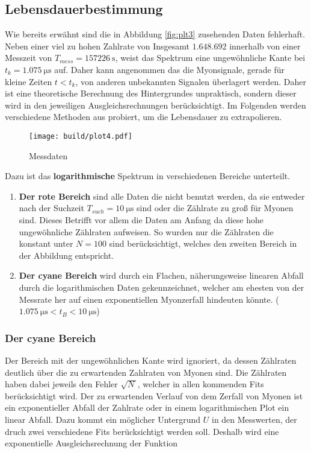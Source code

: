 \subsection{Lebensdauerbestimmung}
Wie bereits erwähnt sind die in Abbildung \eqref{fig:plt3} zusehenden Daten fehlerhaft. 
Neben einer viel zu hohen Zahlrate von Insgesamt $1.648.692$ innerhalb von einer Messzeit von $T_{mess}=\qty{157226}{\s}$,
weist das Spektrum eine ungewöhnliche Kante bei $t_k=\qty{1.075}{\us}$ auf.
Daher kann angenommen das die Myonsignale, gerade für kleine Zeiten $t<t_k$, von anderen unbekannten Signalen überlagert werden. 
Daher ist eine theoretische Berechnung des Hintergrundes unpraktisch, sondern dieser wird in den jeweiligen Ausgleichsrechnungen berücksichtigt. 
Im Folgenden werden verschiedene Methoden aus probiert, um die Lebensdauer zu extrapolieren. 
 
\begin{figure}[H]
	\centering
	\texttt{[image: build/plot4.pdf]}
	\caption{Messdaten}\label{fig:plt4}
\end{figure}

Dazu ist das \textbf{logarithmische} Spektrum in verschiedenen Bereiche unterteilt. 

\begin{enumerate}
	\item \textbf{Der rote Bereich} sind alle Daten die nicht benutzt werden, da sie entweder nach der Suchzeit $T_{such}=\qty{10}{\us}$ sind 
	oder die Zählrate zu groß für Myonen sind. Dieses Betrifft vor allem die Daten am Anfang da diese hohe ungewöhnliche Zählraten aufweisen. 
	So wurden nur die Zählraten die konstant unter $N=100$ sind berücksichtigt, welches den zweiten Bereich in der Abbildung entspricht. 
	\item \textbf{Der cyane Bereich} wird durch ein Flachen, näherungsweise linearen Abfall durch die logarithmischen Daten gekennzeichnet, 
	welcher am ehesten von der Messrate her auf einen exponentiellen Myonzerfall hindeuten könnte. ($\qty{1.075}{\us}<t_B<\qty{10}{\us}$)
\end{enumerate}

\subsubsection{Der cyane Bereich}
Der Bereich mit der ungewöhnlichen Kante wird ignoriert, da dessen Zählraten deutlich über die zu erwartenden Zahlraten von Myonen sind. 
Die Zählraten haben dabei jeweils den Fehler $\sqrt{N\,}$, welcher in allen kommenden Fits berücksichtigt wird. 
Der zu erwartenden Verlauf von dem Zerfall von Myonen ist ein exponentieller Abfall der Zahlrate oder in einem logarithmischen Plot ein linear Abfall. 
Dazu kommt ein möglicher Untergrund $U$ in den Messwerten, der druch zwei verschiedene Fits berücksichtigt werden soll. 
Deshalb wird eine exponentielle Ausgleichsrechnung der Funktion 

